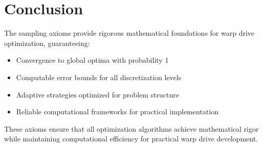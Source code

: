 \documentclass[12pt,a4paper]{article}
\begin{document}
\section{Conclusion}

The sampling axioms provide rigorous mathematical foundations for warp drive optimization, guaranteeing:

\begin{itemize}
\item Convergence to global optima with probability 1
\item Computable error bounds for all discretization levels
\item Adaptive strategies optimized for problem structure
\item Reliable computational frameworks for practical implementation
\end{itemize}

These axioms ensure that all optimization algorithms achieve mathematical rigor while maintaining computational efficiency for practical warp drive development.
\end{document}
